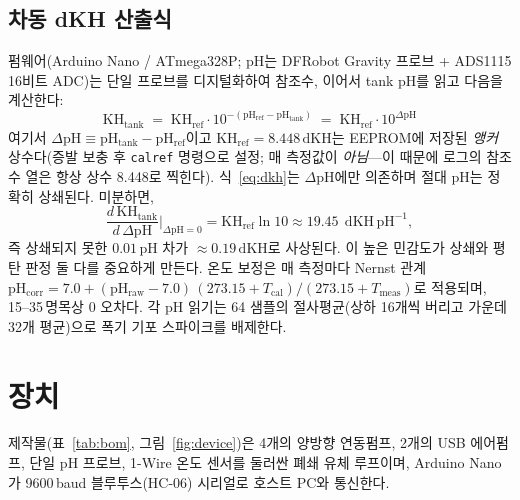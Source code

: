 \documentclass[11pt]{article}
\newcommand{\dpH}{\ensuremath{\Delta\mathrm{pH}}}
\newcommand{\dkh}{\ensuremath{\,\mathrm{dKH}}}
\begin{document}
\subsection{차동 dKH 산출식}
펌웨어(Arduino Nano / ATmega328P; pH는 DFRobot Gravity 프로브 + ADS1115 16비트 ADC)는
단일 프로브를 디지털화하여 참조수, 이어서 tank pH를 읽고 다음을 계산한다:
\begin{equation}
\boxed{\;\mathrm{KH_{tank}} \;=\; \mathrm{KH_{ref}}\cdot 10^{-(\mathrm{pH_{ref}}-\mathrm{pH_{tank}})}
\;=\; \mathrm{KH_{ref}}\cdot 10^{\dpH}\;}
\label{eq:dkh}
\end{equation}
여기서 $\dpH \equiv \mathrm{pH_{tank}}-\mathrm{pH_{ref}}$이고
$\mathrm{KH_{ref}}=8.448\dkh$는 EEPROM에 저장된 \emph{앵커} 상수다(증발 보충 후
\texttt{calref} 명령으로 설정; 매 측정값이 \emph{아님}---이 때문에 로그의 참조수
열은 항상 상수 8.448로 찍힌다). 식~\eqref{eq:dkh}는 \dpH{}에만 의존하며 절대 pH는
정확히 상쇄된다. 미분하면,
\begin{equation}
\frac{d\,\mathrm{KH_{tank}}}{d\,\dpH}\bigg|_{\dpH=0}
= \mathrm{KH_{ref}}\ln 10 \approx 19.45\;\dkh\,\mathrm{pH^{-1}},
\label{eq:sens}
\end{equation}
즉 상쇄되지 못한 $0.01$\,pH 차가 $\approx0.19\dkh$로 사상된다. 이 높은 민감도가
상쇄와 평탄 판정 둘 다를 중요하게 만든다. 온도 보정은 매 측정마다 Nernst 관계
$\mathrm{pH_{corr}}=7.0+(\mathrm{pH_{raw}}-7.0)\,(273.15+T_\mathrm{cal})/(273.15+T_\mathrm{meas})$로
적용되며, 15--35\, 명목상 0 오차다. 각 pH 읽기는 64 샘플의
절사평균(상하 16개씩 버리고 가운데 32개 평균)으로 폭기 기포 스파이크를 배제한다.

\section{장치}\label{sec:apparatus}
제작물(표~\ref{tab:bom}, 그림~\ref{fig:device})은 4개의 양방향 연동펌프, 2개의 USB
에어펌프, 단일 pH 프로브, 1-Wire 온도 센서를 둘러싼 폐쇄 유체 루프이며, Arduino
Nano가 9600\,baud 블루투스(HC-06) 시리얼로 호스트 PC와 통신한다.
\end{document}
